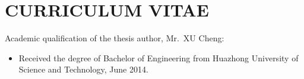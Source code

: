 \chapter[Curriculum Vitae]{CURRICULUM VITAE}

Academic qualification of the thesis author, Mr.~XU Cheng:

\begin{itemize}
  \item Received the degree of Bachelor of Engineering from Huazhong University of Science and Technology, June 2014.
\end{itemize}

\vspace{15ex}%
\begin{flushright}
  \makeatletter%
  \@date%
  \makeatother%
\end{flushright}
